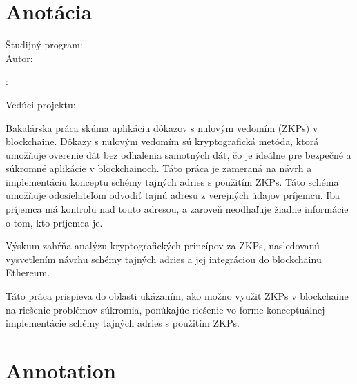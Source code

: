 \thispagestyle{empty}

\vspace*{\fill}

\section*{Anotácia}

\begin{minipage}[t]{1\columnwidth}
    \FIITuniversitySK

    \FIITfacultySK

    Študijný program: \FIITstudyProgramSK\\

    Autor: \FIITauthor

    \FIITthesisSK: \FIITtitleSK

    Vedúci projektu: \FIITsupervisor

    \FIITdateSK
\end{minipage}

\bigskip{}

Bakalárska práca skúma aplikáciu dôkazov s nulovým vedomím (ZKPs) v
blockchaine. Dôkazy s nulovým vedomím sú kryptografická metóda, ktorá
umožňuje overenie dát bez odhalenia samotných dát, čo je ideálne pre bezpečné
a súkromné aplikácie v blockchainoch. Táto práca je zameraná na návrh
a implementáciu konceptu schémy tajných adries s použitím ZKPs. Táto schéma
umožňuje odosielateľom odvodiť tajnú adresu z verejných údajov príjemcu.
Iba príjemca má kontrolu nad touto adresou, a zaroveň neodhaľuje žiadne informácie
o tom, kto príjemca je.

Výskum zahŕňa analýzu kryptografických princípov za ZKPs, nasledovanú
vysvetlením návrhu schémy tajných adries a jej integráciou do blockchainu Ethereum.

Táto práca prispieva do oblasti ukázaním, ako možno využiť ZKPs v blockchaine
na riešenie problémov súkromia, ponúkajúc riešenie vo forme konceptuálnej
implementácie schémy tajných adries s použitím ZKPs.

\newpage{}\thispagestyle{empty}\medskip{}

\emptypage

\thispagestyle{empty}

\vspace*{\fill}

\section*{Annotation}

